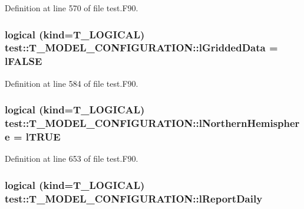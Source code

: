 Definition at line 570 of file test.F90.

\hypertarget{typetest_1_1_t___m_o_d_e_l___c_o_n_f_i_g_u_r_a_t_i_o_n_aac451f732bf0ba0322fd28dc2daad20d}{
\subsubsection[{lGriddedData}]{\setlength{\rightskip}{0pt plus 5cm}logical (kind={\bf T\_\-LOGICAL}) {\bf test::T\_\-MODEL\_\-CONFIGURATION::lGriddedData} = {\bf lFALSE}}}
\label{typetest_1_1_t___m_o_d_e_l___c_o_n_f_i_g_u_r_a_t_i_o_n_aac451f732bf0ba0322fd28dc2daad20d}


Definition at line 584 of file test.F90.

\hypertarget{typetest_1_1_t___m_o_d_e_l___c_o_n_f_i_g_u_r_a_t_i_o_n_abfeef509fcc540a844dfee18f9f996c6}{
\subsubsection[{lNorthernHemisphere}]{\setlength{\rightskip}{0pt plus 5cm}logical (kind={\bf T\_\-LOGICAL}) {\bf test::T\_\-MODEL\_\-CONFIGURATION::lNorthernHemisphere} = {\bf lTRUE}}}
\label{typetest_1_1_t___m_o_d_e_l___c_o_n_f_i_g_u_r_a_t_i_o_n_abfeef509fcc540a844dfee18f9f996c6}


Definition at line 653 of file test.F90.

\hypertarget{typetest_1_1_t___m_o_d_e_l___c_o_n_f_i_g_u_r_a_t_i_o_n_a3f363fa4354689e75c9a1f1a90c1f978}{
\subsubsection[{lReportDaily}]{\setlength{\rightskip}{0pt plus 5cm}logical (kind={\bf T\_\-LOGICAL}) {\bf test::T\_\-MODEL\_\-CONFIGURATION::lReportDaily}}}
\label{typetest_1_1_t___m_o_d_e_l___c_o_n_f_i_g_u_r_a_t_i_o_n_a3f363fa4354689e75c9a1f1a90c1f978}


